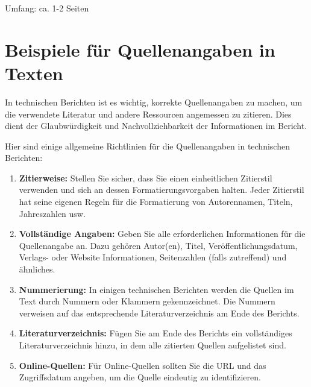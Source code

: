 \documentclass[praktikum,german]{hgbthesis}
\begin{document}
\vskip 8mm
Umfang: ca. 1-2 Seiten


\newpage
\appendix                                                             %
\chapter{Beispiele für Quellenangaben in Texten}

In technischen Berichten ist es wichtig, korrekte Quellenangaben zu machen, um die verwendete Literatur und andere Ressourcen angemessen zu zitieren. Dies dient der Glaubwürdigkeit und Nachvollziehbarkeit der Informationen im Bericht.


\noindent Hier sind einige allgemeine Richtlinien für die Quellenangaben in technischen Berichten:\\

\begin{enumerate}
	\item \textbf{Zitierweise:} Stellen Sie sicher, dass Sie einen einheitlichen Zitierstil verwenden und sich an dessen Formatierungsvorgaben halten. Jeder Zitierstil hat seine eigenen
				Regeln für die Formatierung von Autorennamen, Titeln, Jahreszahlen usw.
	\item \textbf{Vollständige Angaben:} Geben Sie alle erforderlichen Informationen für die Quellenangabe an. Dazu gehören Autor(en), Titel, Veröffentlichungsdatum, Verlags- oder Website
				Informationen, Seitenzahlen (falls zutreffend) und ähnliches.
	\item \textbf{Nummerierung:} In einigen technischen Berichten werden die Quellen im Text durch Nummern oder Klammern gekennzeichnet. Die Nummern verweisen auf das entsprechende
				Literaturverzeichnis am Ende des Berichts.
	\item \textbf{Literaturverzeichnis:} Fügen Sie am Ende des Berichts ein vollständiges Literaturverzeichnis hinzu, in dem alle zitierten Quellen aufgelistet sind.
	\item \textbf{Online-Quellen:} Für Online-Quellen sollten Sie die URL und das Zugriffsdatum angeben, um die Quelle eindeutig zu identifizieren.
\end{enumerate}
\end{document}

